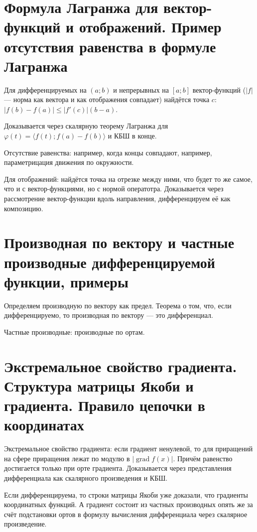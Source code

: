 \documentclass[12pt, a4paper]{article}
\begin{document}
\section{Формула Лагранжа для вектор-функций и отображений. Пример отсутствия равенства в формуле Лагранжа}

    Для дифференцируемых на $(a; b)$ и непрерывных на $[a; b]$ вектор-функций ($|f|$ — норма как вектора и как отображения совпадает) найдётся точка $c$: 
    $|f(b) - f(a)| \leqslant |f'(c)| (b - a)$.

    Доказывается через скалярную теорему Лагранжа для $\varphi(t) = \langle f(t); f(a) - f(b) \rangle$ и КБШ в конце.

    Отсутствие равенства: например, когда концы совпадают, например, параметрицация движения по окружности.

    Для отображений: найдётся точка на отрезке между ними, что будет то же самое, что и с вектор-функциями, но с нормой оператотра. 
    Доказывается через рассмотрение вектор-функции вдоль направления, дифференцируем её как композицию.

\section{Производная по вектору и частные производные дифференцируемой функции, примеры}

    Определяем производную по вектору как предел. Теорема о том, что, если дифференцируемо, 
    то производная по вектору — это дифференциал.

    Частные производные: производные по ортам. 

\section{Экстремальное свойство градиента. Структура матрицы Якоби и градиента. Правило цепочки в координатах}

Экстремальное свойство градиента: если градиент ненулевой, то для приращений на сфере приращения лежат по модулю в $|\operatorname{grad} f(x)|$.
Причём равенство достигается только при орте градиента. Доказывается через представления дифференциала как скалярного произведения и КБШ.

Если дифференцируема, то строки матрицы Якоби уже доказали, что градиенты координатных функций.
А градиент состоит из частных производных опять же за счёт подстановки ортов в формулу вычисления дифференциала через скалярное произведение.
\end{document}
